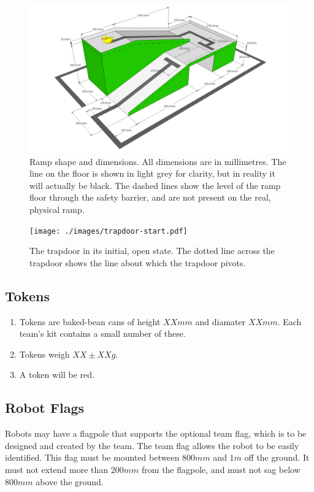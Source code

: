 \begin{figure}
  \includegraphics[keepaspectratio, trim=2cm 0 1cm 0, clip, width=\textwidth]{./images/SR2010-Ramp.png}
  \caption{\label{fig:ramp-dim}Ramp shape and dimensions.  All dimensions are in millimetres.  The line on the floor is shown in light grey for clarity, but in reality it will actually be black.  The dashed lines show the level of the ramp floor through the safety barrier, and are not present on the real, physical ramp.}
\end{figure}

\begin{figure}
  \begin{center}
    \texttt{[image: ./images/trapdoor-start.pdf]}
  \end{center}
  \caption{\label{fig:trapdoor-open}The trapdoor in its initial, open state.  The dotted line across the trapdoor shows the line about which the trapdoor pivots.}
\end{figure}

\subsection{Tokens}
\label{tokens}
\begin {enumerate} 
\item Tokens are baked-bean cans of height $XXmm$ and diamater $XXmm$.
 Each team's kit contains a small number of these.
\item Tokens weigh $XX\pm{}XXg$.
\item A token will be red.
\end {enumerate}

\subsection{Robot Flags}
\label{sec:flags}
Robots may have a flagpole that supports the optional team flag, which
is to be designed and created by the team. The team flag allows the
robot to be easily identified.  This flag must be mounted between
$800mm$ and $1m$ off the ground.  It must not extend more than $200mm$
from the flagpole, and must not sag below $800mm$ above the ground.

